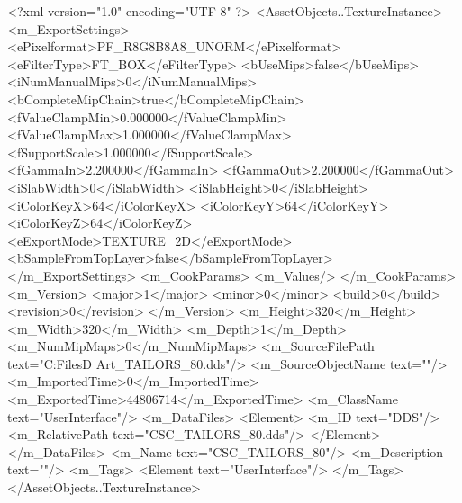 <?xml version="1.0" encoding="UTF-8" ?>
<AssetObjects..TextureInstance>
	<m_ExportSettings>
		<ePixelformat>PF_R8G8B8A8_UNORM</ePixelformat>
		<eFilterType>FT_BOX</eFilterType>
		<bUseMips>false</bUseMips>
		<iNumManualMips>0</iNumManualMips>
		<bCompleteMipChain>true</bCompleteMipChain>
		<fValueClampMin>0.000000</fValueClampMin>
		<fValueClampMax>1.000000</fValueClampMax>
		<fSupportScale>1.000000</fSupportScale>
		<fGammaIn>2.200000</fGammaIn>
		<fGammaOut>2.200000</fGammaOut>
		<iSlabWidth>0</iSlabWidth>
		<iSlabHeight>0</iSlabHeight>
		<iColorKeyX>64</iColorKeyX>
		<iColorKeyY>64</iColorKeyY>
		<iColorKeyZ>64</iColorKeyZ>
		<eExportMode>TEXTURE_2D</eExportMode>
		<bSampleFromTopLayer>false</bSampleFromTopLayer>
	</m_ExportSettings>
	<m_CookParams>
		<m_Values/>
	</m_CookParams>
	<m_Version>
		<major>1</major>
		<minor>0</minor>
		<build>0</build>
		<revision>0</revision>
	</m_Version>
	<m_Height>320</m_Height>
	<m_Width>320</m_Width>
	<m_Depth>1</m_Depth>
	<m_NumMipMaps>0</m_NumMipMaps>
	<m_SourceFilePath text="C:\Users\Shadow\Desktop\Working Files\2D Art\Quarters\Tailors\CSC_TAILORS_80.dds"/>
	<m_SourceObjectName text=""/>
	<m_ImportedTime>0</m_ImportedTime>
	<m_ExportedTime>44806714</m_ExportedTime>
	<m_ClassName text="UserInterface"/>
	<m_DataFiles>
		<Element>
			<m_ID text="DDS"/>
			<m_RelativePath text="CSC_TAILORS_80.dds"/>
		</Element>
	</m_DataFiles>
	<m_Name text="CSC_TAILORS_80"/>
	<m_Description text=""/>
	<m_Tags>
		<Element text="UserInterface"/>
	</m_Tags>
</AssetObjects..TextureInstance>

